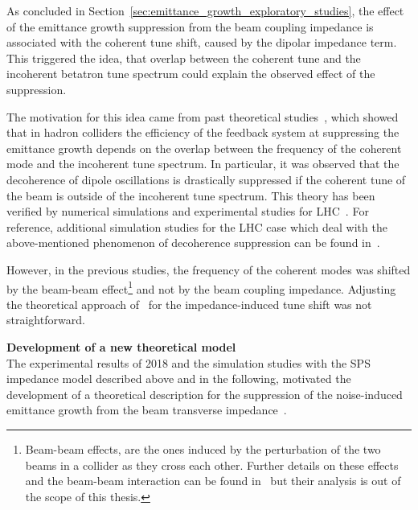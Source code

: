 As concluded in Section~\ref{sec:emittance_growth_exploratory_studies}, the effect of the emittance growth suppression from the beam coupling impedance is associated with the coherent tune shift, caused by the dipolar impedance term. This triggered the idea, that overlap between the coherent tune and the incoherent betatron tune spectrum could explain the observed effect of the suppression. 

The motivation for this idea came from past theoretical studies~\cite{Alexahin:314169, Alexahin:485304}, which showed that in hadron colliders the efficiency of the feedback system at suppressing the emittance growth depends on the overlap between the frequency of the coherent mode and the incoherent tune spectrum. In particular, it was observed that the decoherence of dipole oscillations is drastically suppressed if the coherent tune of the beam is outside of the incoherent tune spectrum. This theory has been verified by numerical simulations and experimental studies for LHC~\cite{QIANG201853, PhysRevAccelBeams.23.021002, PhysRevAccelBeams.24.011003}. %
For reference, additional simulation studies for the LHC case which deal with the above-mentioned phenomenon of decoherence suppression can be found in~\cite{Alexahin:497415, Herr:486007}. 


However, in the previous studies, the frequency of the coherent modes was shifted by the beam-beam effect\footnote{Beam-beam effects, are the ones induced by the perturbation of the two beams in a collider as they cross each other. Further details on these effects and the beam-beam interaction can be found in~\cite{Herr:1982430} but their analysis is out of the scope of this thesis.} and not by the beam coupling impedance. Adjusting the theoretical approach of~\cite{Alexahin:314169} for the impedance-induced tune shift was not straightforward. 


\textbf{Development of a new theoretical model}\\
The experimental results of 2018 and the simulation studies with the SPS impedance model described above and in the following, motivated the development of a theoretical description for the suppression of the noise-induced emittance growth from the beam transverse impedance~\cite{Buffat:2022dac, van_kamper_presentation_xavier_theory}. 

